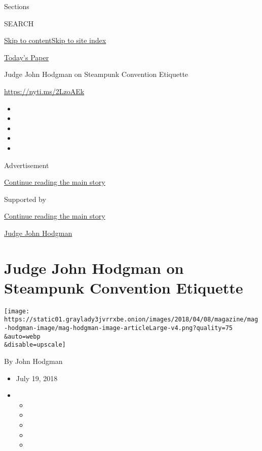 Sections

SEARCH

\protect\hyperlink{site-content}{Skip to
content}\protect\hyperlink{site-index}{Skip to site index}

\href{https://myaccount.nytimes3xbfgragh.onion/auth/login?response_type=cookie\&client_id=vi}{}

\href{https://www.nytimes3xbfgragh.onion/section/todayspaper}{Today's
Paper}

Judge John Hodgman on Steampunk Convention Etiquette

\url{https://nyti.ms/2LzoAEk}

\begin{itemize}
\item
\item
\item
\item
\item
\end{itemize}

Advertisement

\protect\hyperlink{after-top}{Continue reading the main story}

Supported by

\protect\hyperlink{after-sponsor}{Continue reading the main story}

\href{/column/judge-john-hodgman}{Judge John Hodgman}

\hypertarget{judge-john-hodgman-on-steampunk-convention-etiquette}{%
\section{Judge John Hodgman on Steampunk Convention
Etiquette}\label{judge-john-hodgman-on-steampunk-convention-etiquette}}

\texttt{[image: https://static01.graylady3jvrrxbe.onion/images/2018/04/08/magazine/mag-hodgman-image/mag-hodgman-image-articleLarge-v4.png?quality=75\\\&auto=webp\\\&disable=upscale]}

By John Hodgman

\begin{itemize}
\item
  July 19, 2018
\item
  \begin{itemize}
  \item
  \item
  \item
  \item
  \item
  \end{itemize}
\end{itemize}

